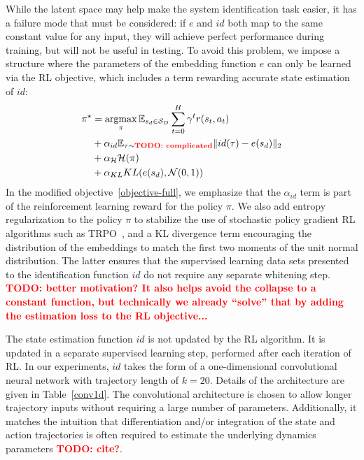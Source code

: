 \documentclass{article}
\newcommand{\E}{\mathbb{E}}
\newcommand{\TODO}[1]{\textcolor{red}{\textbf{TODO: #1}}}
\newcommand{\cH}{\mathcal{H}}
\newcommand{\cN}{\mathcal{N}}
\newcommand{\cS}{\mathcal{S}}
\DeclareMathOperator*{\argmax}{argmax}
\begin{document}
While the latent space may help make the system identification task easier,
it has a failure mode that must be considered:
if $e$ and $id$ both map to the same constant value for any input,
they will achieve perfect performance during training,
but will not be useful in testing.
To avoid this problem, we impose a structure where the parameters of the embedding function $e$
can only be learned via the RL objective, which includes a term rewarding accurate state estimation of $id$:
\begin{equation}\begin{split}
\pi^\star &= \argmax_\pi \E_{s_d \in \cS_D} \sum_{t = 0}^H \gamma^t r(s_t, a_t) \\
&+ \alpha_{id} \E_{\tau \sim \text{\TODO{complicated}}} \| id(\tau) - e(s_d) \|_2 \\
&+ \alpha_{\cH}\cH(\pi) \\
&+ \alpha_{KL} KL(e(s_d), \cN(0,1))
\label{objective-full}
\end{split}\end{equation}
In the modified objective~\eqref{objective-full},
we emphasize that the $\alpha_{id}$ term is part of the reinforcement learning reward
for the policy $\pi$.
We also add entropy regularization to the policy $\pi$ to stabilize the use of stochastic policy gradient RL algorithms such as TRPO~\citep{schulman-TRPO-icml15},
and a KL divergence term encouraging the distribution of the embeddings
to match the first two moments of the unit normal distribution.
The latter ensures that the supervised learning data sets presented to the identification function $id$ do not require any separate whitening step.
\TODO{better motivation? It also helps avoid the collapse to a constant function,
but technically we already ``solve'' that by adding the estimation loss to the RL objective...}

The state estimation function $id$ is not updated by the RL algorithm.
It is updated in a separate supervised learning step, performed after each iteration of RL.
In our experiments, $id$ takes the form of a one-dimensional convolutional neural network
with trajectory length of $k = 20$.
Details of the architecture are given in Table~\ref{conv1d}.
The convolutional architecture is chosen to allow longer trajectory inputs
without requiring a large number of parameters.
Additionally, it matches the intuition that differentiation and/or integration of the state and action trajectories
is often required to estimate the underlying dynamics parameters \TODO{cite?}.
\end{document}

